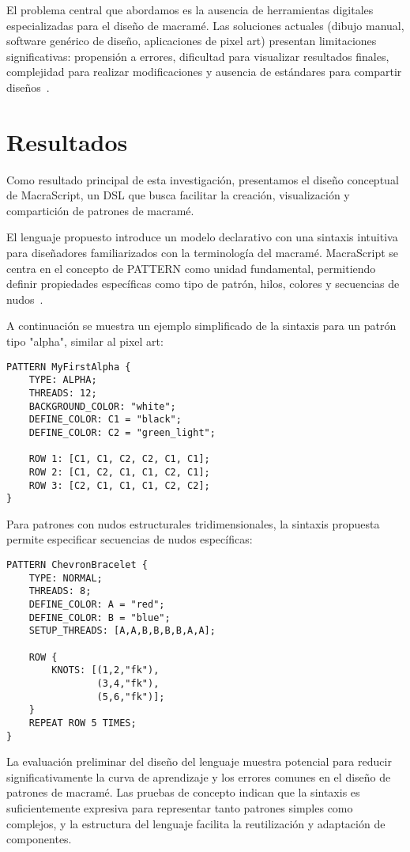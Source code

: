 \documentclass[conference]{IEEEtran}
\begin{document}
El problema central que abordamos es la ausencia de herramientas digitales especializadas para el diseño de macramé. Las soluciones actuales (dibujo manual, software genérico de diseño, aplicaciones de pixel art) presentan limitaciones significativas: propensión a errores, dificultad para visualizar resultados finales, complejidad para realizar modificaciones y ausencia de estándares para compartir diseños~\cite{owen1997}.

\section{Resultados}
Como resultado principal de esta investigación, presentamos el diseño conceptual de MacraScript, un DSL que busca facilitar la creación, visualización y compartición de patrones de macramé.

El lenguaje propuesto introduce un modelo declarativo con una sintaxis intuitiva para diseñadores familiarizados con la terminología del macramé. MacraScript se centra en el concepto de PATTERN como unidad fundamental, permitiendo definir propiedades específicas como tipo de patrón, hilos, colores y secuencias de nudos~\cite{voelter2013}.

A continuación se muestra un ejemplo simplificado de la sintaxis para un patrón tipo "alpha", similar al pixel art:

\begin{verbatim}
PATTERN MyFirstAlpha {
    TYPE: ALPHA;
    THREADS: 12;
    BACKGROUND_COLOR: "white";
    DEFINE_COLOR: C1 = "black";
    DEFINE_COLOR: C2 = "green_light";
    
    ROW 1: [C1, C1, C2, C2, C1, C1];
    ROW 2: [C1, C2, C1, C1, C2, C1];
    ROW 3: [C2, C1, C1, C1, C2, C2];
}
\end{verbatim}

Para patrones con nudos estructurales tridimensionales, la sintaxis propuesta permite especificar secuencias de nudos específicas:

\begin{verbatim}
PATTERN ChevronBracelet {
    TYPE: NORMAL;
    THREADS: 8;
    DEFINE_COLOR: A = "red";
    DEFINE_COLOR: B = "blue";
    SETUP_THREADS: [A,A,B,B,B,B,A,A];

    ROW { 
        KNOTS: [(1,2,"fk"), 
                (3,4,"fk"), 
                (5,6,"fk")]; 
    }
    REPEAT ROW 5 TIMES;
}
\end{verbatim}

La evaluación preliminar del diseño del lenguaje muestra potencial para reducir significativamente la curva de aprendizaje y los errores comunes en el diseño de patrones de macramé. Las pruebas de concepto indican que la sintaxis es suficientemente expresiva para representar tanto patrones simples como complejos, y la estructura del lenguaje facilita la reutilización y adaptación de componentes.
\end{document}
